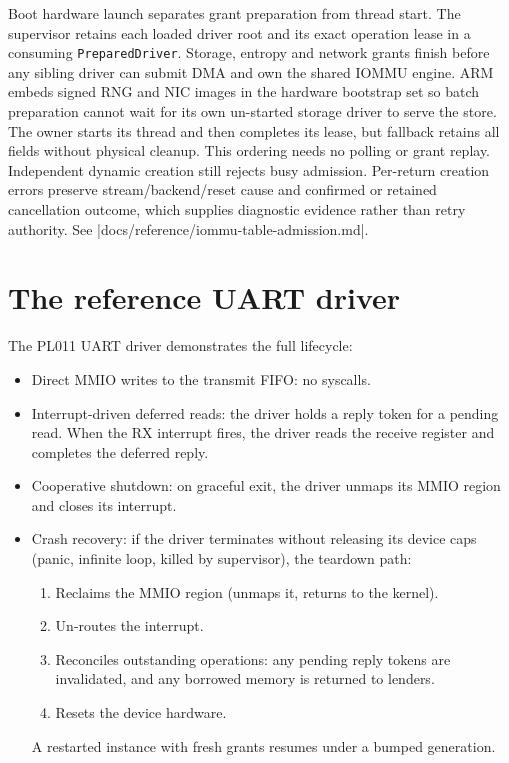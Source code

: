 Boot hardware launch separates grant preparation from thread start. The
supervisor retains each loaded driver root and its exact operation lease in a
consuming \texttt{PreparedDriver}. Storage, entropy and network grants finish
before any sibling driver can submit DMA and own the shared IOMMU engine.
ARM embeds signed RNG and NIC images in the hardware bootstrap set so batch
preparation cannot wait for its own un-started storage driver to serve the store.
The owner starts its thread and then completes its lease, but fallback retains all
fields without physical cleanup. This ordering needs no polling or grant replay.
Independent dynamic creation still rejects busy admission. Per-return creation
errors preserve stream/backend/reset cause and confirmed or retained cancellation
outcome, which supplies diagnostic evidence rather than retry authority. See
\repofile|docs/reference/iommu-table-admission.md|.

\section{The reference UART driver}

The PL011 UART driver demonstrates the full lifecycle:

\begin{itemize}
    \item Direct MMIO writes to the transmit FIFO: no syscalls.
    \item Interrupt-driven deferred reads: the driver holds a reply
        token for a pending read. When the RX interrupt fires, the driver reads
        the receive register and completes the deferred reply.
    \item Cooperative shutdown: on graceful exit, the driver unmaps its
        MMIO region and closes its interrupt.
    \item Crash recovery: if the driver terminates without releasing
        its device caps (panic, infinite loop, killed by supervisor), the
        teardown path:
        \begin{enumerate}
            \item Reclaims the MMIO region (unmaps it, returns to the kernel).
            \item Un-routes the interrupt.
            \item Reconciles outstanding operations: any pending reply tokens
                are invalidated, and any borrowed memory is returned to lenders.
            \item Resets the device hardware.
        \end{enumerate}
        A restarted instance with fresh grants resumes under a bumped
        generation.
\end{itemize}

